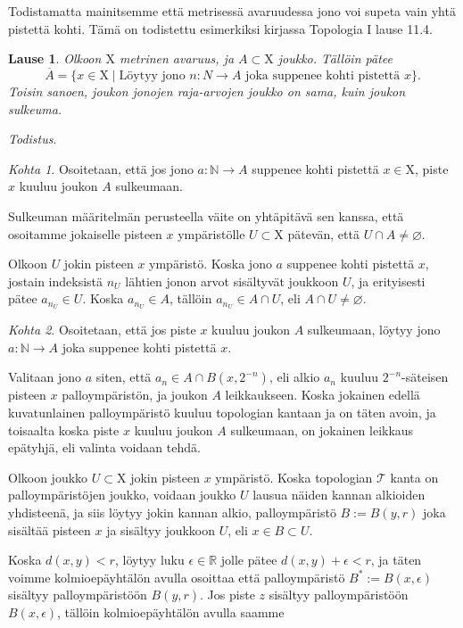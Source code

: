 \documentclass[12pt,a4paper,leqno]{report}
\newcommand{\R}{\mathbb{R}}
\newcommand{\N}{\mathbb{N}}
\newcommand{\X}{\mathrm{X}}
\newcommand{\T}{\mathcal{T}}
\theoremstyle{plain}
\newtheorem{lause}[equation]{Lause}
\theoremstyle{definition}
\theoremstyle{remark}
\begin{document}
Todistamatta mainitsemme että metrisessä avaruudessa jono voi supeta vain yhtä pistettä kohti. Tämä on todistettu esimerkiksi kirjassa Topologia I \cite{Topo1} lause 11.4.

\begin{lause}
Olkoon $\X$ metrinen avaruus, ja $A \subset \X$ joukko. Tällöin pätee
\begin{equation}
\overline{A} = \{x \in \X \mid \text{Löytyy jono } n : N \to A \text{ joka suppenee kohti pistettä } x\}\text{.}
\end{equation}
Toisin sanoen, joukon jonojen raja-arvojen joukko on sama, kuin joukon sulkeuma.
\end{lause}

\noindent\emph{Todistus}.

\emph{Kohta 1}. Osoitetaan, että jos jono $a : \N \to A$ suppenee kohti pistettä $x \in \X$, piste $x$ kuuluu joukon $A$ sulkeumaan.

Sulkeuman määritelmän perusteella väite on yhtäpitävä sen kanssa, että osoitamme jokaiselle pisteen $x$ ympäristölle $U \subset \X$ pätevän, että $U \cap A \not= \varnothing$.

Olkoon $U$ jokin pisteen $x$ ympäristö. Koska jono $a$ suppenee kohti pistettä $x$, jostain indeksistä $n_U$ lähtien jonon arvot sisältyvät joukkoon $U$, ja erityisesti pätee $a_{n_U} \in U$. Koska $a_{n_U} \in A$, tällöin $a_{n_U} \in A \cap U$, eli $A \cap U \not= \varnothing$.

\emph{Kohta 2}. Osoitetaan, että jos piste $x$ kuuluu joukon $A$ sulkeumaan, löytyy jono $a : \N \to A$ joka suppenee kohti pistettä $x$.

Valitaan jono $a$ siten, että $a_n \in A \cap B(x, 2^{-n})$, eli alkio $a_n$ kuuluu $2^{-n}$-säteisen pisteen $x$ palloympäristön, ja joukon $A$ leikkaukseen. Koska jokainen edellä kuvatunlainen palloympäristö kuuluu topologian kantaan ja on täten avoin, ja toisaalta koska piste $x$ kuuluu joukon $A$ sulkeumaan, on jokainen leikkaus epätyhjä, eli valinta voidaan tehdä.

Olkoon joukko $U \subset \X$ jokin pisteen $x$ ympäristö. Koska topologian $\T$ kanta on palloympäristöjen joukko, voidaan joukko $U$ lausua näiden kannan alkioiden yhdisteenä, ja siis löytyy jokin kannan alkio, palloympäristö $B := B(y,r)$ joka sisältää pisteen $x$ ja sisältyy joukkoon $U$, eli $x \in B \subset U$.

Koska $d(x,y) < r$, löytyy luku $\epsilon \in \R$ jolle pätee $d(x,y) + \epsilon < r$, ja täten voimme kolmioepäyhtälön avulla osoittaa että palloympäristö $B^* := B(x,\epsilon)$ sisältyy palloympäristöön $B(y,r)$. Jos piste $z$ sisältyy palloympäristöön $B(x,\epsilon)$, tällöin kolmioepäyhtälön avulla saamme
\end{document}
